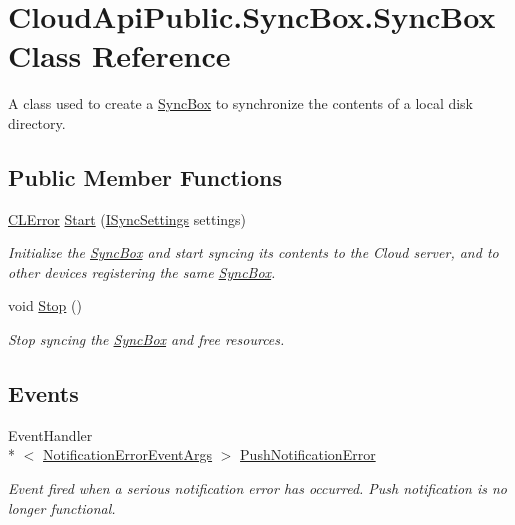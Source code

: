\hypertarget{class_cloud_api_public_1_1_sync_box_1_1_sync_box}{\section{Cloud\-Api\-Public.\-Sync\-Box.\-Sync\-Box Class Reference}
\label{class_cloud_api_public_1_1_sync_box_1_1_sync_box}
}


A class used to create a \hyperlink{class_cloud_api_public_1_1_sync_box_1_1_sync_box}{Sync\-Box} to synchronize the contents of a local disk directory.  


\subsection*{Public Member Functions}
\begin{DoxyCompactItemize}
\item 
\hyperlink{class_cloud_api_public_1_1_model_1_1_c_l_error}{C\-L\-Error} \hyperlink{class_cloud_api_public_1_1_sync_box_1_1_sync_box_a9aecfc402491f67c9f449d555143b6b9}{Start} (\hyperlink{interface_cloud_api_public_1_1_interfaces_1_1_i_sync_settings}{I\-Sync\-Settings} settings)
\begin{DoxyCompactList}\small\item\em Initialize the \hyperlink{class_cloud_api_public_1_1_sync_box_1_1_sync_box}{Sync\-Box} and start syncing its contents to the Cloud server, and to other devices registering the same \hyperlink{class_cloud_api_public_1_1_sync_box_1_1_sync_box}{Sync\-Box}. \end{DoxyCompactList}\item 
void \hyperlink{class_cloud_api_public_1_1_sync_box_1_1_sync_box_a6e00abb80199ee3606fd5f0e6f9047d9}{Stop} ()
\begin{DoxyCompactList}\small\item\em Stop syncing the \hyperlink{class_cloud_api_public_1_1_sync_box_1_1_sync_box}{Sync\-Box} and free resources. \end{DoxyCompactList}\end{DoxyCompactItemize}
\subsection*{Events}
\begin{DoxyCompactItemize}
\item 
Event\-Handler\\*
$<$ \hyperlink{class_cloud_api_public_1_1_push_notification_1_1_notification_error_event_args}{Notification\-Error\-Event\-Args} $>$ \hyperlink{class_cloud_api_public_1_1_sync_box_1_1_sync_box_a8ddba93f4254b9ebfd56277ace63ff68}{Push\-Notification\-Error}
\begin{DoxyCompactList}\small\item\em Event fired when a serious notification error has occurred. Push notification is no longer functional. \end{DoxyCompactList}\end{DoxyCompactItemize}


